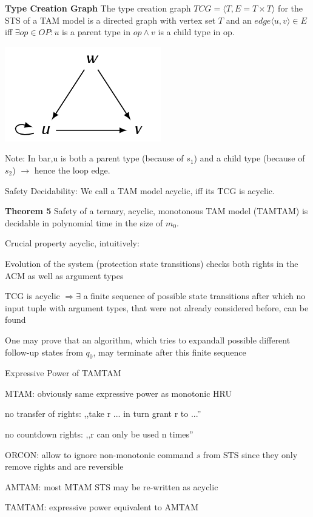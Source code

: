\documentclass[a4paper]{article}
\renewcommand{\note}[2]{\begin{noteBox} \textbf{#1} #2 \end{noteBox}}
\begin{document}
\begin{multicols}{3}
    \note{Type Creation Graph}{The type creation graph $TCG=\langle T,E=T\times T\rangle$ for the STS of a TAM model is a directed graph with vertex set $T$ and an $edge\langle u,v\rangle \in E$ iff $\exists op\in OP:u$ is a parent type in $op\wedge v$ is a child type in op.}

    \includegraphics[width=.5\linewidth]{Assets/Systemsicherheit-acyclic-tam-example.png}

    Note: In bar,u is both a parent type (because of $s_1$) and a child type (because of $s_2$) $\rightarrow$ hence the loop edge.

    Safety Decidability: We call a TAM model acyclic, iff its TCG is acyclic.

    \note{Theorem 5}{Safety of a ternary, acyclic, monotonous TAM model (TAMTAM) is decidable in polynomial time in the size of $m_0$.}

    Crucial property acyclic, intuitively:
    \begin{itemize*}
        \item Evolution of the system (protection state transitions) checks both rights in the ACM as well as argument types
        \item TCG is acyclic $\Rightarrow\exists$ a finite sequence of possible state transitions after which no input tuple with argument types, that were not already considered before, can be found
        \item One may prove that an algorithm, which tries to expandall possible different follow-up states from $q_0$, may terminate after this finite sequence
    \end{itemize*}

    Expressive Power of TAMTAM
    \begin{itemize*}
        \item MTAM: obviously same expressive power as monotonic HRU
        \begin{itemize*}
            \item no transfer of rights: ,,take r ... in turn grant r to ...''
            \item no countdown rights: ,,r can only be used n times''
        \end{itemize*}
        \item ORCON: allow to ignore non-monotonic command $s$ from STS since they only remove rights and are reversible
        \item AMTAM: most MTAM STS may be re-written as acyclic
        \item TAMTAM: expressive power equivalent to AMTAM
    \end{itemize*}


\end{multicols}
\end{document}
